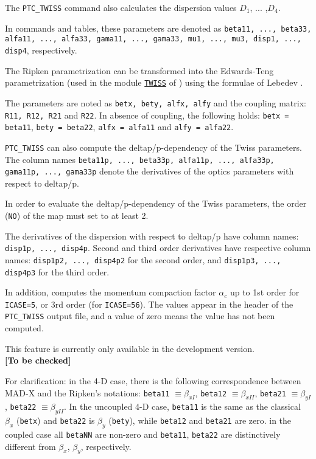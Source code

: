 The {\tt PTC\_TWISS} command also calculates the dispersion values
$D_1$, ... ,$D_4$.

In \madx commands and tables, these parameters are denoted as
{\tt beta11, ..., beta33, alfa11, ..., alfa33, gama11, ..., gama33,
  mu1, ..., mu3, disp1, ..., disp4}, respectively.

The Ripken parametrization can be transformed into the Edwards-Teng
parametrization (used in the module \hyperref[chap:twiss]{\tt TWISS} of
\madx) using the formulae of Lebedev \cite{lebedev2010}.

The parameters are noted as {\tt betx, bety, alfx, alfy} and the
coupling matrix: {\tt R11, R12, R21} and {\tt R22}. In absence of
coupling, the following holds: {\tt betx = beta11}, {\tt bety = beta22},
{\tt alfx = alfa11} and {\tt alfy = alfa22}.

{\tt PTC\_TWISS} can also compute the deltap/p-dependency of the Twiss
parameters. The column names {\tt beta11p, ..., beta33p,
  alfa11p, ..., alfa33p, gama11p, ..., gama33p} denote the derivatives of
the optics parameters with respect to deltap/p. 

In order to evaluate the deltap/p-dependency of the Twiss parameters,
the order ({\tt NO}) of the map must set to at least 2.  

The derivatives of the dispersion with respect to deltap/p have column
names: {\tt disp1p, ..., disp4p}. 
Second and third order derivatives have respective column names:  
{\tt disp1p2, ..., disp4p2} for the second order, and 
{\tt disp1p3, ..., disp4p3} for the third order.

In addition, \ptc computes the momentum compaction factor $\alpha_c$ up to
1st order for {\tt ICASE=5}, or 3rd order (for {\tt ICASE=56}). The
values appear in the header of the {\tt PTC\_TWISS} output file, and a
value of zero means the value has not been computed.

This feature is currently only available in the development
version. \\
{\bf [To be checked]}

For clarification: in the 4-D case, there is the following
correspondence between MAD-X and the Ripken's notations:  
{\tt beta11} $\equiv \beta_{xI}$, 
{\tt beta12} $\equiv \beta_{xII}$, 
{\tt beta21} $\equiv \beta_{yI}$, 
{\tt beta22} $\equiv \beta_{yII}$.
In the uncoupled 4-D case, {\tt beta11} is the same as the
classical $\beta_x$ ({\tt betx}) and {\tt beta22} is $\beta_y$ 
({\tt bety}), while {\tt beta12} and {\tt beta21} are zero.  
in the coupled case all {\tt betaNN} are non-zero and {\tt beta11},
{\tt beta22} are distinctively different from $\beta_x$, $\beta_y$,
respectively.

